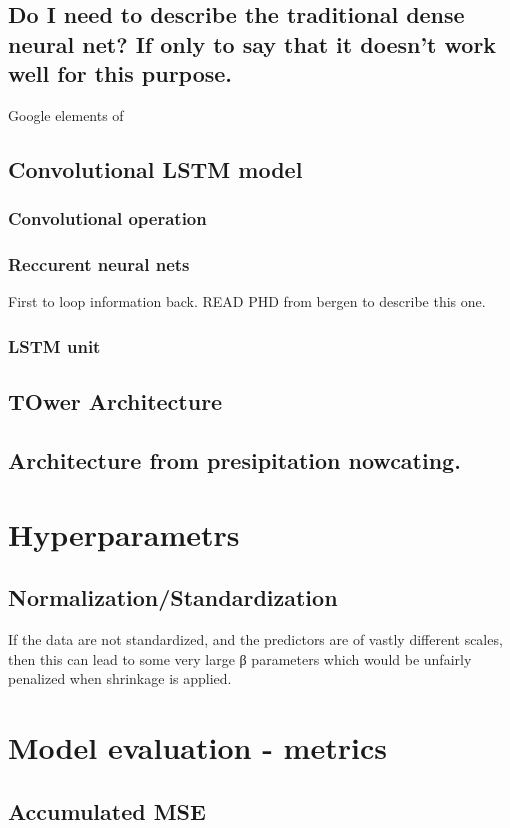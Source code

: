 \subsection{Do I need to describe the traditional dense neural net? If only to say that it doesn't work well for this purpose.}

Google elements of 

\subsection{Convolutional LSTM model}

\subsubsection{Convolutional operation}
\subsubsection{Reccurent neural nets }
First to loop information back. READ PHD from bergen to describe this one. 
\subsubsection{LSTM unit}

\subsection{TOwer Architecture}
\subsection{Architecture from presipitation nowcating.}


\section{Hyperparametrs}
\subsection{Normalization/Standardization}
If the data are not standardized, and the predictors are of vastly different scales, then this can lead to some very large β parameters which would be unfairly penalized when shrinkage is applied.

\section{Model evaluation - metrics}
\subsection{Accumulated MSE}


